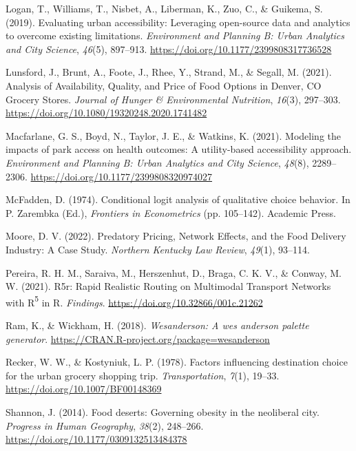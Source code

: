 \documentclass[
  letterpaper,
  number,
  review,
  doubleblind,
  3p]{elsarticle}
\newlength{\cslhangindent}
\newenvironment{CSLReferences}[2] %
 {\begin{list}{}{%
  \setlength{\itemindent}{0pt}
  \setlength{\leftmargin}{0pt}
  \setlength{\parsep}{0pt}
  \ifodd #1
   \setlength{\leftmargin}{\cslhangindent}
   \setlength{\itemindent}{-1\cslhangindent}
  \fi
  \setlength{\itemsep}{#2\baselineskip}}}
 {\end{list}}
\begin{document}
\begin{CSLReferences}{1}{0}
Logan, T., Williams, T., Nisbet, A., Liberman, K., Zuo, C., \& Guikema,
S. (2019). Evaluating urban accessibility: Leveraging open-source data
and analytics to overcome existing limitations. \emph{Environment and
Planning B: Urban Analytics and City Science}, \emph{46}(5), 897--913.
\url{https://doi.org/10.1177/2399808317736528}

Lunsford, J., Brunt, A., Foote, J., Rhee, Y., Strand, M., \& Segall, M.
(2021). Analysis of {Availability}, {Quality}, and {Price} of {Food
Options} in {Denver}, {CO Grocery Stores}. \emph{Journal of Hunger \&
Environmental Nutrition}, \emph{16}(3), 297--303.
\url{https://doi.org/10.1080/19320248.2020.1741482}

Macfarlane, G. S., Boyd, N., Taylor, J. E., \& Watkins, K. (2021).
Modeling the impacts of park access on health outcomes: {A}
utility-based accessibility approach. \emph{Environment and Planning B:
Urban Analytics and City Science}, \emph{48}(8), 2289--2306.
\url{https://doi.org/10.1177/2399808320974027}

McFadden, D. (1974). Conditional logit analysis of qualitative choice
behavior. In P. Zarembka (Ed.), \emph{Frontiers in {Econometrics}} (pp.
105--142). Academic Press.

Moore, D. V. (2022). Predatory {Pricing}, {Network Effects}, and the
{Food Delivery Industry}: {A Case Study}. \emph{Northern Kentucky Law
Review}, \emph{49}(1), 93--114.

Pereira, R. H. M., Saraiva, M., Herszenhut, D., Braga, C. K. V., \&
Conway, M. W. (2021). R5r: {Rapid Realistic Routing} on {Multimodal
Transport Networks} with {R}{\textsuperscript{5}} in {R}.
\emph{Findings}. \url{https://doi.org/10.32866/001c.21262}

Ram, K., \& Wickham, H. (2018). \emph{Wesanderson: A wes anderson
palette generator}. \url{https://CRAN.R-project.org/package=wesanderson}

Recker, W. W., \& Kostyniuk, L. P. (1978). Factors influencing
destination choice for the urban grocery shopping trip.
\emph{Transportation}, \emph{7}(1), 19--33.
\url{https://doi.org/10.1007/BF00148369}

Shannon, J. (2014). Food deserts: {Governing} obesity in the neoliberal
city. \emph{Progress in Human Geography}, \emph{38}(2), 248--266.
\url{https://doi.org/10.1177/0309132513484378}


\end{CSLReferences}
\end{document}
